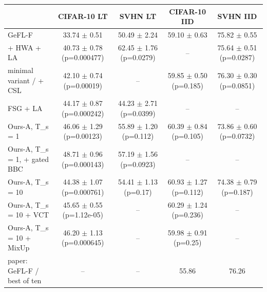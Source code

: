 \begin{tabular}{lcccc}
\toprule
 & CIFAR-10 LT & SVHN LT & CIFAR-10 IID & SVHN IID \\
\midrule
GeFL-F & 33.74 $\pm$ 0.51 & 50.49 $\pm$ 2.24 & 59.10 $\pm$ 0.63 & 75.82 $\pm$ 0.55 \\
+ HWA + LA & 40.73 $\pm$ 0.78 (p=0.000477) & 62.45 $\pm$ 1.76 (p=0.0279) & -- & 75.64 $\pm$ 0.51 (p=0.0287) \\
minimal variant / + CSL & 42.10 $\pm$ 0.74 (p=0.00019) & -- & 59.85 $\pm$ 0.50 (p=0.185) & 76.30 $\pm$ 0.30 (p=0.0851) \\
FSG + LA & 44.17 $\pm$ 0.87 (p=0.000242) & 44.23 $\pm$ 2.71 (p=0.0399) & -- & -- \\
Ours-A, T\_s = 1 & 46.06 $\pm$ 1.29 (p=0.00123) & 55.89 $\pm$ 1.20 (p=0.112) & 60.39 $\pm$ 0.84 (p=0.105) & 73.86 $\pm$ 0.60 (p=0.0732) \\
Ours-A, T\_s = 1, + gated BBC & 48.71 $\pm$ 0.96 (p=0.000143) & 57.19 $\pm$ 1.56 (p=0.0923) & -- & -- \\
Ours-A, T\_s = 10 & 44.38 $\pm$ 1.07 (p=0.000761) & 54.41 $\pm$ 1.13 (p=0.17) & 60.93 $\pm$ 1.27 (p=0.112) & 74.38 $\pm$ 0.79 (p=0.187) \\
Ours-A, T\_s = 10 + VCT & 45.65 $\pm$ 0.55 (p=1.12e-05) & -- & 60.29 $\pm$ 1.24 (p=0.236) & -- \\
Ours-A, T\_s = 10 + MixUp & 46.20 $\pm$ 1.13 (p=0.000645) & -- & 59.98 $\pm$ 0.91 (p=0.25) & -- \\
paper: GeFL-F / best of ten & -- & -- & 55.86 & 76.26 \\
\bottomrule
\end{tabular}
